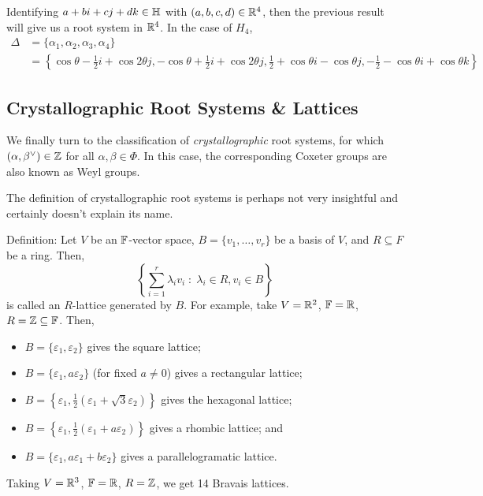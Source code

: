 Identifying $a+bi+cj+dk \in \mathbb{H}$ with $(a,b,c,d) \in \mathbb{R}^4$, then the previous
result will give us a root system in $\mathbb{R}^4$. In the case of $H_4$,
\begin{align*} %
    \Delta &= \{\alpha_1, \alpha_2, \alpha_3, \alpha_4\} \\
    &= \left\{
        \cos \theta - \frac{1}{2} i + \cos 2\theta j,
        -\cos \theta + \frac{1}{2} i + \cos 2\theta j,
        \frac{1}{2} + \cos \theta i - \cos \theta j,
        -\frac{1}{2} - \cos \theta i + \cos \theta k
    \right\}
\end{align*}

\subsection{Crystallographic Root Systems \& Lattices}

We finally turn to the classification of {\em crystallographic} root systems,
for which $(\alpha, \beta^\vee) \in \mathbb{Z}$ for all $\alpha, \beta \in \Phi$.
In this case, the corresponding Coxeter groups are also known as Weyl groups.

The definition of crystallographic root systems is perhaps not very insightful
and certainly doesn't explain its name.

Definition: Let $V$ be an $\mathbb{F}$-vector space, $B = \{v_1, \dots, v_r\}$ be a
basis of $V$, and $R \subseteq F$ be a ring. Then,
\[
    \left\{ \sum_{i=1}^{r} \lambda_i v_i \; : \; \lambda_i \in R, v_i \in B\right\}
\]
is called an $R$-lattice generated by $B$.
For example, take $V = \mathbb{R}^2$, $\mathbb{F} = \mathbb{R}$, $R = \mathbb{Z} \subseteq \mathbb{F}$. Then,
\begin{itemize}
\item
$B = \{\varepsilon_1, \varepsilon_2\}$ gives the square lattice;
\item
$B = \{\varepsilon_1, a\varepsilon_2\}$ (for fixed $a \neq 0$) gives a
rectangular lattice;
\item
$B = \left\{\varepsilon_1, \frac{1}{2}(\varepsilon_1 + \sqrt{3} \varepsilon_2)\right\}$
gives the hexagonal lattice;
\item
$B = \left\{\varepsilon_1, \frac{1}{2} (\varepsilon_1 + a\varepsilon_2) \right\}$
gives a rhombic lattice; and
\item
$B = \{\varepsilon_1, a\varepsilon_1 + b\varepsilon_2\}$
gives a parallelogramatic lattice.
\end{itemize}
Taking $V = \mathbb{R}^3$, $\mathbb{F} = \mathbb{R}$, $R = \mathbb{Z}$, we get 14 Bravais lattices.


